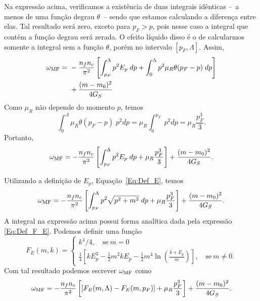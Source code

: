 Na expressão acima, verificamos a existência de duas integrais idênticas --~a menos de uma função degrau $\theta$~-- sendo que estamos calculando a diferença entre elas. Tal resultado será zero, exceto para $p_F > p$, pois nesse caso a integral que contém a função degrau será zerada. O efeito líquido disso é o de calcularmos somente a integral sem a função $\theta$, porém no intervalo $[p_F, \Lambda]$. Assim,
\begin{equation}
\begin{split}
\omega_{\rm{MF}} =&~ - \frac{n_f n_c}{\pi^2} \left[\int_{p_F}^\Lambda p^2E_p \; dp + \int_0^\Lambda p^2 \mu_R \theta(p_F - p)\;dp \right] \\
&~ + \frac{(m-m_0)^2}{4G_S} \\
\end{split}
\end{equation}
%
Como $\mu_R$ não depende do momento $p$, temos
\begin{equation}
	\int_0^\Lambda \mu_R \theta(p_F - p) \; p^2dp = \mu_R \int_{0}^{p_F} \; p^2dp = \mu_R\frac{p_F^3}{3}.
\end{equation}
%
Portanto,
\begin{equation}
\omega_{\rm{MF}} = - \frac{n_f n_c}{\pi^2} \left[\int_{p_F}^\Lambda p^2E_p \; dp + \mu_R \frac{p_F^3}{3} \right] + \frac{(m-m_0)^2}{4G_S}.
\end{equation}

Utilizando a definição de $E_p$, Equação~\eqref{Eq:Def_E}, temos
\begin{equation}
	\omega_{\rm{MF}} = - \frac{n_f n_c}{\pi^2} \left[\int_{p_F}^\Lambda p^2\sqrt{p^2 + m^2} \; dp + \mu_R \frac{p_F^3}{3} \right] + \frac{(m-m_0)^2}{4G_S}.
\end{equation}
%
A integral na expressão acima possui forma analítica dada pela expressão \eqref{Eq:Def_F_E}. Podemos definir uma função \begin{equation}
	F_E(m, k) = \begin{cases} k^4 / 4, \quad \textrm{se}~ m = 0 \\ \frac{1}{4}\left[kE_p^3 - \frac{1}{2}m^2kE_p - \frac{1}{2}m^4\ln\left(\frac{k + E_p}{m}\right)\right], \quad \textrm{se}~ m \neq 0. \end{cases}
\end{equation}
%
Com tal resultado podemos escrever $\omega_{\rm{MF}}$ como
\begin{equation}\label{Eq:Pot_termodinamico_1}
\omega_{\rm{MF}} = - \frac{n_f n_c}{\pi^2} \left[[F_E(m,\Lambda) - F_E(m, p_F)] + \mu_R \frac{p_F^3}{3} \right] + \frac{(m-m_0)^2}{4G_S}.
\end{equation}

